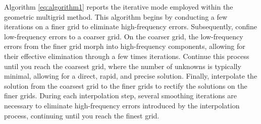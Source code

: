 \documentclass[extra, referee]{gji}
\begin{document}
Algorithm \ref{eq:algorithm1} reports the iterative mode employed within the
geometric multigrid method. This algorithm begins by conducting a few iterations
on a finer grid to eliminate high-frequency errors. Subsequently, confine
low-frequency errors to a coarser grid. On the coarser grid, the low-frequency
errors from the finer grid morph into high-frequency components, allowing for
their effective elimination through a few times iterations. Continue this
process until you reach the coarsest grid, where the number of unknowns is
typically minimal, allowing for a direct, rapid, and precise solution. Finally,
interpolate the solution from the coarsest grid to the finer grids to rectify
the solutions on the finer grids. During each interpolation step, several
smoothing iterations are necessary to eliminate high-frequency errors introduced
by the interpolation process, continuing until you reach the finest grid.
\end{document}
